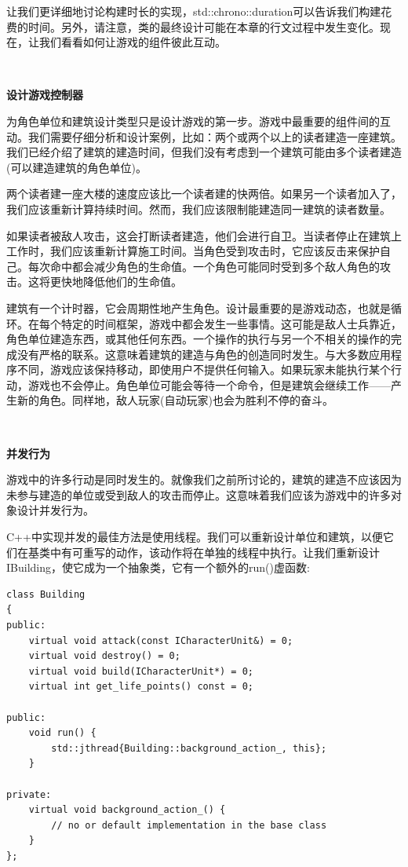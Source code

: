 让我们更详细地讨论构建时长的实现，std::chrono::duration可以告诉我们构建花费的时间。另外，请注意，类的最终设计可能在本章的行文过程中发生变化。现在，让我们看看如何让游戏的组件彼此互动。 \par

\noindent\textbf{}\ \par
\textbf{设计游戏控制器} \ \par
为角色单位和建筑设计类型只是设计游戏的第一步。游戏中最重要的组件间的互动。我们需要仔细分析和设计案例，比如：两个或两个以上的读者建造一座建筑。我们已经介绍了建筑的建造时间，但我们没有考虑到一个建筑可能由多个读者建造(可以建造建筑的角色单位)。 \par
两个读者建一座大楼的速度应该比一个读者建的快两倍。如果另一个读者加入了，我们应该重新计算持续时间。然而，我们应该限制能建造同一建筑的读者数量。 \par
如果读者被敌人攻击，这会打断读者建造，他们会进行自卫。当读者停止在建筑上工作时，我们应该重新计算施工时间。当角色受到攻击时，它应该反击来保护自己。每次命中都会减少角色的生命值。一个角色可能同时受到多个敌人角色的攻击。这将更快地降低他们的生命值。 \par
建筑有一个计时器，它会周期性地产生角色。设计最重要的是游戏动态，也就是循环。在每个特定的时间框架，游戏中都会发生一些事情。这可能是敌人士兵靠近，角色单位建造东西，或其他任何东西。一个操作的执行与另一个不相关的操作的完成没有严格的联系。这意味着建筑的建造与角色的创造同时发生。与大多数应用程序不同，游戏应该保持移动，即使用户不提供任何输入。如果玩家未能执行某个行动，游戏也不会停止。角色单位可能会等待一个命令，但是建筑会继续工作——产生新的角色。同样地，敌人玩家(自动玩家)也会为胜利不停的奋斗。 \par

\noindent\textbf{}\ \par
\textbf{并发行为} \ \par
游戏中的许多行动是同时发生的。就像我们之前所讨论的，建筑的建造不应该因为未参与建造的单位或受到敌人的攻击而停止。这意味着我们应该为游戏中的许多对象设计并发行为。 \par
C++中实现并发的最佳方法是使用线程。我们可以重新设计单位和建筑，以便它们在基类中有可重写的动作，该动作将在单独的线程中执行。让我们重新设计IBuilding，使它成为一个抽象类，它有一个额外的run()虚函数: \par

\begin{lstlisting}[caption={}]
class Building
{
public:
	virtual void attack(const ICharacterUnit&) = 0;
	virtual void destroy() = 0;
	virtual void build(ICharacterUnit*) = 0;
	virtual int get_life_points() const = 0;
	
public:
	void run() {
		std::jthread{Building::background_action_, this};
	}

private:
	virtual void background_action_() {
		// no or default implementation in the base class
	}
};
\end{lstlisting}

